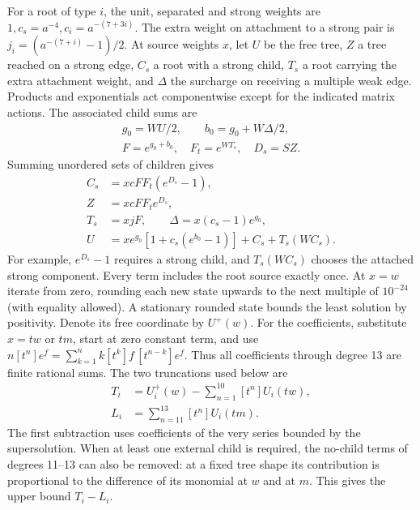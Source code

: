 \documentclass[10pt,twocolumn]{article}
\theoremstyle{definition}
\begin{document}
For a root of type $i$, the unit, separated and strong weights are
$1,c_s=a^{-4},c_i=a^{-(7+3i)}$. The extra weight on attachment to
a strong pair is $j_i=(a^{-(7+i)}-1)/2$. At source weights $x$,
let $U$ be the free tree, $Z$ a tree reached on a strong edge, $C_s$
a root with a strong child, $T_s$ a root carrying the extra
attachment weight, and $\Delta$ the surcharge on receiving a multiple
weak edge. Products and exponentials act componentwise except for
the indicated matrix actions. The associated child sums are
\[
\begin{gathered}
 g_0=WU/2,\qquad b_0=g_0+W\Delta/2,\\
 F=e^{g_0+b_0},\quad F_t=e^{WT_s},\quad D_s=SZ.
\end{gathered}
\]
Summing unordered sets of children gives
\[
\begin{aligned}
 C_s &= x c F F_t(e^{D_s}-1),\\
 Z &= x c F F_t e^{D_s},\\
 T_s &=x j F,\qquad \Delta=x(c_s-1)e^{g_0},\\
 U   &=x e^{g_0}[1+c_s(e^{b_0}-1)]
           +C_s+T_s(WC_s).
\end{aligned}
\]
For example, $e^{D_s}-1$ requires a strong child, and $T_s(WC_s)$
chooses the attached strong component. Every term includes the root
source exactly once. At $x=w$ iterate from zero, rounding each new
state upwards to the next multiple of $10^{-24}$ (with equality
allowed). A stationary rounded state bounds the least solution by
positivity. Denote its free coordinate by $U^+(w)$.
For the coefficients, substitute $x=t w$ or $t m$, start at zero
constant term, and use
$n[t^n]e^f=\sum_{k=1}^n k[t^k]f\,[t^{n-k}]e^f$.
Thus all coefficients through degree 13 are finite rational sums.
The two truncations used below are
\[
\begin{aligned}
 T_i &= U_i^+(w)-\sum_{n=1}^{10}[t^n]U_i(tw),\\
 L_i &= \sum_{n=11}^{13}[t^n]U_i(tm).
\end{aligned}
\]
The first subtraction uses coefficients of the very series bounded
by the supersolution. When at least one external child is required,
the no-child terms of degrees 11--13 can also be removed: at a fixed
tree shape its contribution is proportional to the difference of
its monomial at $w$ and at $m$. This gives the upper bound $T_i-L_i$.
\end{document}
